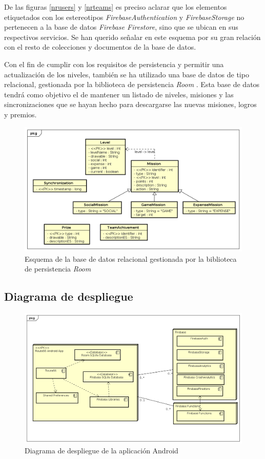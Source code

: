 \documentclass[twoside]{report}
\begin{document}
De las figuras \ref{nrusers} y \ref{nrteams} es preciso aclarar que los elementos etiquetados con los estereotipos \textit{FirebaseAuthentication} y \textit{FirebaseStorage} no pertenecen a la base de datos \textit{Firebase Firestore}, sino que se ubican en sus respectivos servicios. Se han querido señalar en este esquema por su gran relación con el resto de colecciones y documentos de la base de datos.


Con el fin de cumplir con los requisitos de persistencia y permitir una actualización de los niveles, también se ha utilizado una base de datos de tipo relacional, gestionada por la biblioteca de persistencia  \textit{Room} \cite{roompersistence}. Esta base de datos tendrá como objetivo el de mantener un listado de niveles, misiones y las sincronizaciones que se hayan hecho para descargarse las nuevas misiones, logros y premios.

\begin{figure}[H]
\centering
\includegraphics[scale=0.5]{images/databaseRoom}
\caption{Esquema de la base de datos relacional gestionada por la biblioteca de persistencia \textit{Room} \cite{roompersistence}}
\end{figure}

\subsection{Diagrama de despliegue}

\begin{figure}[H]
\centering
\includegraphics[scale=0.5]{images/deploymentModel}
\caption{Diagrama de despliegue de la aplicación Android}
\end{figure}
\end{document}
